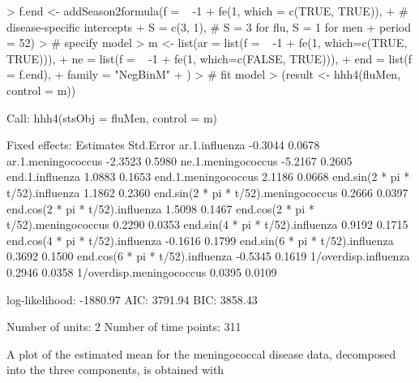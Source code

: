\documentclass[a4paper,11pt]{article}
\begin{document}
\begin{Schunk}
\begin{Sinput}
> f.end <- addSeason2formula(f = ~ -1 + fe(1, which = c(TRUE, TRUE)), 
+                                            # disease-specific intercepts
+                            S = c(3, 1),    # S = 3 for flu, S = 1 for men
+                            period = 52)
> # specify model
> m <- list(ar = list(f = ~ -1 + fe(1, which=c(TRUE, TRUE))), 
+           ne = list(f = ~ -1 + fe(1, which=c(FALSE, TRUE))), 
+           end = list(f = f.end),
+           family = "NegBinM"
+           )
> # fit model
> (result <- hhh4(fluMen, control = m))
\end{Sinput}
\begin{Soutput}
Call: 
hhh4(stsObj = fluMen, control = m)


Fixed effects: 
                                      Estimates  Std.Error
ar.1.influenza                          -0.3044     0.0678
ar.1.meningococcus                      -2.3523     0.5980
ne.1.meningococcus                      -5.2167     0.2605
end.1.influenza                          1.0883     0.1653
end.1.meningococcus                      2.1186     0.0668
end.sin(2 * pi * t/52).influenza         1.1862     0.2360
end.sin(2 * pi * t/52).meningococcus     0.2666     0.0397
end.cos(2 * pi * t/52).influenza         1.5098     0.1467
end.cos(2 * pi * t/52).meningococcus     0.2290     0.0353
end.sin(4 * pi * t/52).influenza         0.9192     0.1715
end.cos(4 * pi * t/52).influenza        -0.1616     0.1799
end.sin(6 * pi * t/52).influenza         0.3692     0.1500
end.cos(6 * pi * t/52).influenza        -0.5345     0.1619
1/overdisp.influenza                     0.2946     0.0358
1/overdisp.meningococcus                 0.0395     0.0109

log-likelihood:    -1880.97 
AIC:               3791.94 
BIC:               3858.43 

Number of units:          2 
Number of time points:    311 
\end{Soutput}
\end{Schunk}
A plot of the estimated mean for the meningococcal disease data, 
decomposed into the three components, is obtained with
\end{document}
